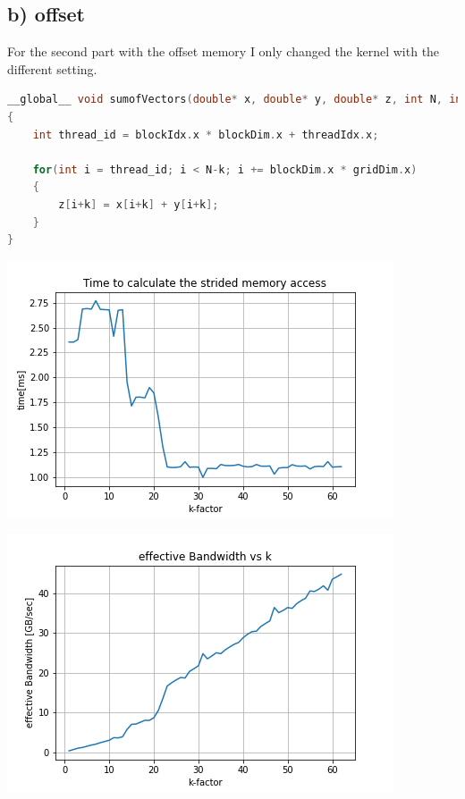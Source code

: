 \documentclass[11pt,a4paper]{article}
\begin{document}
\subsection*{b) offset}
For the second part with the offset memory I only changed the kernel with the different setting.
\begin{lstlisting}[language=C++, caption={code for 1b)}]
__global__ void sumofVectors(double* x, double* y, double* z, int N, int k)
{
	int thread_id = blockIdx.x * blockDim.x + threadIdx.x;

	for(int i = thread_id; i < N-k; i += blockDim.x * gridDim.x)
	{
		z[i+k] = x[i+k] + y[i+k];
	}
}
\end{lstlisting}
\begin{minipage}[t]{0.49\textwidth}
	\includegraphics[width=\textwidth]{Bilder/Runtime_offset.png}
\end{minipage}
\begin{minipage}[t]{0.49\textwidth}
	\includegraphics[width=\textwidth]{Bilder/Bandwidth_offset.png}
\end{minipage}
\end{document}
